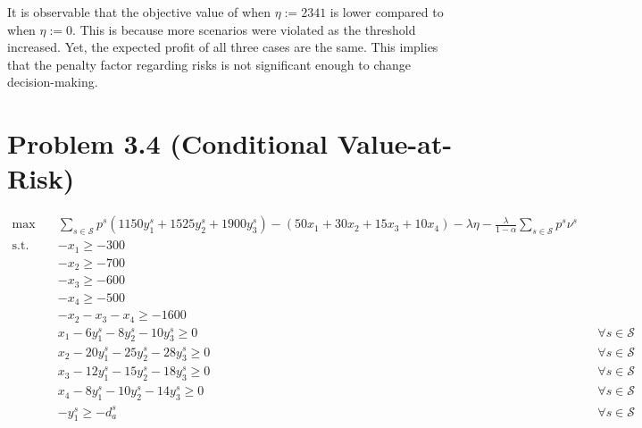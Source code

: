 \documentclass[7pt]{article}
\begin{document}
It is observable that the objective value of when $\eta:=2341$ is lower
compared to when $\eta:=0$. This is because more scenarios were violated as the
threshold increased. Yet, the expected profit of all three cases are the same.
This implies that the penalty factor regarding risks is not significant enough
to change decision-making.

\section{Problem 3.4 (Conditional Value-at-Risk)}
\vspace{-1.5em}
\begin{align*}
    \max \quad
     & \sum_{s \in \mathcal{S}} p^s \left(1150y_1^s + 1525y_2^s + 1900 y_3^s \right)
    - \left(50 x_1 + 30 x_2 + 15 x_3 + 10 x_4 \right) - \lambda\eta - \frac{\lambda}{1-\alpha}\sum_{s \in \mathcal{S}}p^s\nu^s       \\
    \text{s.t.} \quad
     & -x_1 \geq -300                                                                                                                \\
     & -x_2 \geq -700                                                                                                                \\
     & -x_3 \geq -600                                                                                                                \\
     & -x_4 \geq -500                                                                                                                \\
     & -x_2 - x_3 - x_4 \geq -1600                                                                                                   \\
     & x_1 - 6 y_1^s - 8 y_2^s - 10 y_3^s \geq 0 \quad                                                &  & \forall s \in \mathcal{S} \\
     & x_2 - 20 y_1^s - 25 y_2^s - 28 y_3^s \geq 0 \quad                                              &  & \forall s \in \mathcal{S} \\
     & x_3 - 12 y_1^s - 15 y_2^s - 18 y_3^s \geq 0 \quad                                              &  & \forall s \in \mathcal{S} \\
     & x_4 - 8 y_1^s - 10 y_2^s - 14 y_3^s \geq 0 \quad                                               &  & \forall s \in \mathcal{S} \\
     & -y_1^s \geq -d_a^s                                                                             &  & \forall s \in \mathcal{S} \\

\end{align*}
\end{document}
